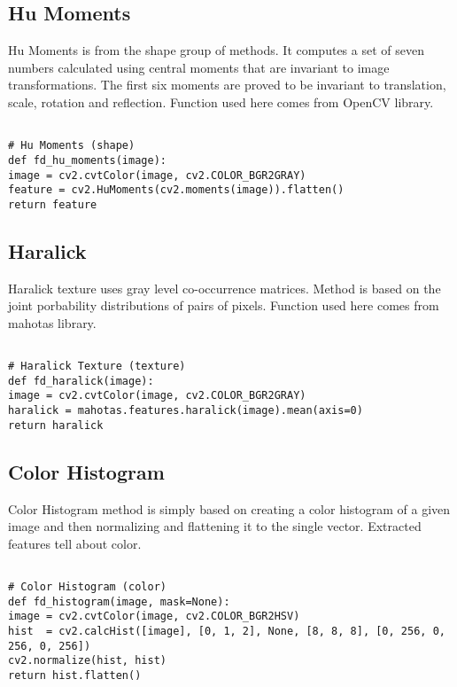 \documentclass{article}
\begin{document}
\subsection{Hu Moments}

Hu Moments is from the shape group of methods. It computes a set of seven numbers calculated  using central moments that are invariant to image transformations. The first six moments are proved to be invariant to translation, scale, rotation and reflection. Function used here comes from OpenCV library.

\begin{verbatim}

# Hu Moments (shape)
def fd_hu_moments(image):
image = cv2.cvtColor(image, cv2.COLOR_BGR2GRAY)
feature = cv2.HuMoments(cv2.moments(image)).flatten()
return feature

\end{verbatim}

\subsection{Haralick}

Haralick texture uses gray level co-occurrence matrices. Method is based on the joint porbability distributions of pairs of pixels. Function used here comes from mahotas library.

\begin{verbatim}

# Haralick Texture (texture)
def fd_haralick(image):
image = cv2.cvtColor(image, cv2.COLOR_BGR2GRAY)
haralick = mahotas.features.haralick(image).mean(axis=0)
return haralick

\end{verbatim}

\subsection{Color Histogram}

Color Histogram method is simply based on creating a color histogram of a given image and then normalizing and flattening it to the single vector. Extracted features tell about color.

\begin{verbatim}

# Color Histogram (color)
def fd_histogram(image, mask=None):
image = cv2.cvtColor(image, cv2.COLOR_BGR2HSV)
hist  = cv2.calcHist([image], [0, 1, 2], None, [8, 8, 8], [0, 256, 0, 256, 0, 256])
cv2.normalize(hist, hist)
return hist.flatten()

\end{verbatim}
\end{document}
